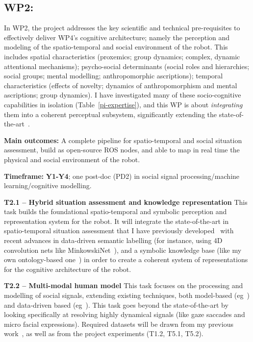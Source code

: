 \subsection{WP2: \textbf{\wpTwo}}


In WP2, the project addresses the key scientific and technical pre-requisites to
effectively deliver WP4's cognitive architecture; namely the perception and modeling of
the spatio-temporal and social environment of the robot. This includes spatial
characteristics (proxemics; group dynamics; complex, dynamic attentional
mechanisms); psycho-social determinants (social roles and hierarchies; social
groups; mental modelling; anthropomorphic ascriptions); temporal characteristics
(effects of novelty; dynamics of anthropomorphism and mental ascriptions; group
dynamics). I have investigated many of these socio-cognitive capabilities in
isolation (Table~\ref{pi-expertise}), and this WP is about
\emph{integrating} them into a coherent perceptual subsystem, significantly
extending the state-of-the-art~\cite{lemaignan2017artificial, baxter2016cognitive}.

\begin{framed}
    \textbf{Main outcomes:} A complete pipeline for spatio-temporal and social
    situation assessment, build as open-source ROS nodes, and able to map in
    real time the physical and social environment of the robot.

    \textbf{Timeframe:} \textbf{Y1-Y4}; one post-doc (PD2) in social
signal processing/machine learning/cognitive modelling.
\end{framed}

\textbf{T2.1 -- Hybrid situation assessment and knowledge representation} This
task builds the foundational spatio-temporal and symbolic perception and
representation system for the robot. It will integrate the state-of-the-art in
spatio-temporal situation assessment that I have previously
developed~\cite{lemaignan2018underworlds, sallami2019simulation} with recent
advances in data-driven semantic labelling (for instance, using 4D convolution
nets like MinkowskiNet~\cite{choy20194d}), and a symbolic knowledge base (like
my own ontology-based one~\cite{lemaignan2010oro}) in order to create a coherent
system of representations for the cognitive architecture of the robot.

\textbf{T2.2 -- Multi-modal human model} This task focuses on the processing and
modelling of social signals, extending existing techniques, both model-based
(eg~\cite{gunes2017automatic,lemaignan2016realtime}) and data-driven based
(eg~\cite{bartlett2019what}). This task goes beyond the state-of-the-art by
looking specifically at resolving highly dynamical signals (like gaze saccades
and micro facial expressions). Required datasets will be drawn from my previous
work~\cite{lemaignan2018pinsoro}, as well as from the project experiments (T1.2,
T5.1, T5.2).

